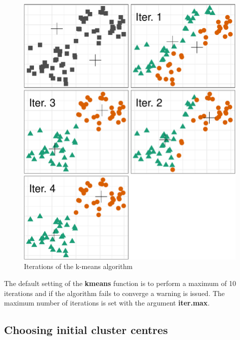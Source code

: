 \documentclass[]{book}
\theoremstyle{definition}
\theoremstyle{definition}
\theoremstyle{definition}
\theoremstyle{remark}
\begin{document}
\begin{figure}

{\centering \includegraphics[width=0.9\linewidth]{09-clustering_files/figure-latex/kmeansIterations-1} 

}

\caption{Iterations of the k-means algorithm}\label{fig:kmeansIterations}
\end{figure}

The default setting of the \textbf{kmeans} function is to perform a
maximum of 10 iterations and if the algorithm fails to converge a
warning is issued. The maximum number of iterations is set with the
argument \textbf{iter.max}.

\subsection{Choosing initial cluster
centres}\label{choosing-initial-cluster-centres}
\end{document}
